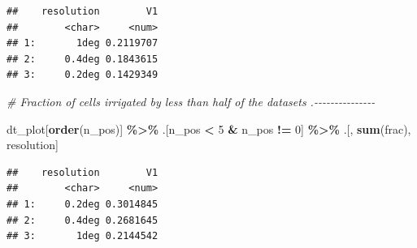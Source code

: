 \documentclass[
  11pt,
]{article}
\newenvironment{Shaded}{\begin{snugshade}}{\end{snugshade}}
\newcommand{\CommentTok}[1]{\textcolor[rgb]{0.56,0.35,0.01}{\textit{#1}}}
\newcommand{\DecValTok}[1]{\textcolor[rgb]{0.00,0.00,0.81}{#1}}
\newcommand{\FunctionTok}[1]{\textcolor[rgb]{0.13,0.29,0.53}{\textbf{#1}}}
\newcommand{\NormalTok}[1]{#1}
\newcommand{\SpecialCharTok}[1]{\textcolor[rgb]{0.81,0.36,0.00}{\textbf{#1}}}
\begin{document}
\begin{verbatim}
##    resolution        V1
##        <char>     <num>
## 1:       1deg 0.2119707
## 2:     0.4deg 0.1843615
## 3:     0.2deg 0.1429349
\end{verbatim}

\begin{Shaded}
\begin{Highlighting}[]
\CommentTok{\# Fraction of cells irrigated by less than half of the datasets .{-}{-}{-}{-}{-}{-}{-}{-}{-}{-}{-}{-}{-}{-}{-}}

\NormalTok{dt\_plot[}\FunctionTok{order}\NormalTok{(n\_pos)] }\SpecialCharTok{\%\textgreater{}\%}
\NormalTok{  .[n\_pos }\SpecialCharTok{\textless{}} \DecValTok{5} \SpecialCharTok{\&}\NormalTok{ n\_pos }\SpecialCharTok{!=} \DecValTok{0}\NormalTok{] }\SpecialCharTok{\%\textgreater{}\%}
\NormalTok{  .[, }\FunctionTok{sum}\NormalTok{(frac), resolution]}
\end{Highlighting}
\end{Shaded}

\begin{verbatim}
##    resolution        V1
##        <char>     <num>
## 1:     0.2deg 0.3014845
## 2:     0.4deg 0.2681645
## 3:       1deg 0.2144542
\end{verbatim}
\end{document}
